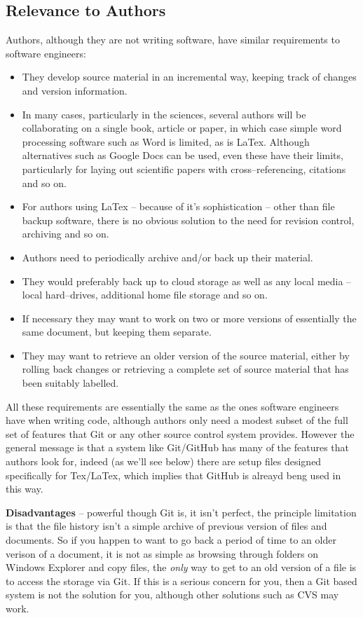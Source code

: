 \documentclass[a4paper, 12pt]{article}
\begin{document}
\subsection{Relevance to Authors}
Authors, although they are not writing software, have similar requirements to software engineers:
\begin{itemize}
\item They develop source material in an incremental way, keeping track of changes and version information.
\item In many cases, particularly in the sciences, several authors will be collaborating on a single book, article or paper, in which case simple word processing software such as Word is limited, as is LaTex. Although alternatives such as Google Docs can be used, even these have their limits, particularly for laying out scientific papers with cross--referencing, citations and so on.
\item For authors using LaTex -- because of it's sophistication -- other than file backup software, there is no obvious solution to the need for revision control, archiving and so on.
\item Authors need to periodically archive and/or back up their material.
\item They would preferably back up to cloud storage as well as any local media -- local hard--drives, additional home file storage and so on.
\item If necessary they may want to work on two or more versions of essentially the same document, but keeping them separate.
\item They may want to retrieve an older version of the source material, either by rolling back changes or retrieving a complete set of source material that has been suitably labelled.
\end{itemize}
All these requirements are essentially the same as the ones software engineers have when writing code, although authors only need a modest subset of the full set of features that Git or any other source control system provides. However the general message is that a system like Git/GitHub has many of the features that authors look for, indeed (as we'll see below) there are setup files designed specifically for Tex/LaTex, which implies that GitHub is alreayd beng used in this way.

\textbf{Disadvantages} -- powerful though Git is, it isn't perfect, the principle limitation is that the file history isn't a simple archive of previous version of files and documents. So if you happen to want to go back a period of time to an older verison of a document, it is not as simple as browsing through folders on Windows Explorer and copy files, the \textit{only} way to get to an old version of a file is to access the storage via Git. If this is a serious concern for you, then a Git based system is not the solution for you, although other solutions such as CVS may work.
\end{document}
